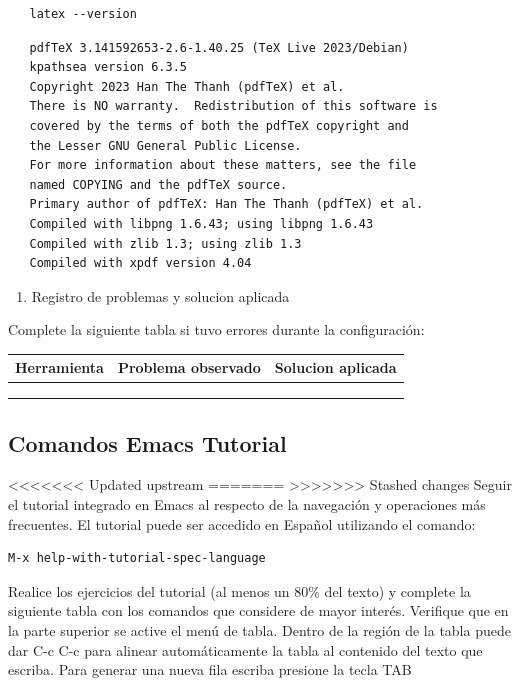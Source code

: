 \documentclass{article}
\begin{document}
\begin{verbatim}
   latex --version
\end{verbatim}

\begin{verbatim}
   pdfTeX 3.141592653-2.6-1.40.25 (TeX Live 2023/Debian)
   kpathsea version 6.3.5
   Copyright 2023 Han The Thanh (pdfTeX) et al.
   There is NO warranty.  Redistribution of this software is
   covered by the terms of both the pdfTeX copyright and
   the Lesser GNU General Public License.
   For more information about these matters, see the file
   named COPYING and the pdfTeX source.
   Primary author of pdfTeX: Han The Thanh (pdfTeX) et al.
   Compiled with libpng 1.6.43; using libpng 1.6.43
   Compiled with zlib 1.3; using zlib 1.3
   Compiled with xpdf version 4.04
\end{verbatim}



\begin{enumerate}
>>>>>>> Stashed changes
\item Registro de problemas y solucion aplicada
\end{enumerate}

Complete la siguiente tabla si tuvo errores durante la configuración:

\begin{center}
\begin{tabularx}{\textwidth}{lXX}
\textbf{Herramienta} & \textbf{Problema observado} & \textbf{Solucion aplicada}\\[0pt]
\hline
 &  & \\[0pt]
 &  & \\[0pt]
 &  & \\[0pt]
\end{tabularx}
\end{center}

\subsection{Comandos Emacs Tutorial}
<<<<<<< Updated upstream
\label{sec:orga04160f}
=======
\label{sec:org48b9c71}
>>>>>>> Stashed changes
Seguir el tutorial integrado en Emacs al respecto de la navegación y
operaciones más frecuentes. El tutorial puede ser accedido en Español
utilizando el comando:

\begin{verbatim}
M-x help-with-tutorial-spec-language
\end{verbatim}

Realice los ejercicios del tutorial (al menos un 80\% del texto) y
complete la siguiente tabla con los comandos que considere de mayor
interés. Verifique que en la parte superior se active el menú de
tabla. Dentro de la región de la tabla puede dar C-c C-c para alinear
automáticamente la tabla al contenido del texto que escriba. Para
generar una nueva fila escriba presione la tecla TAB
\end{document}
